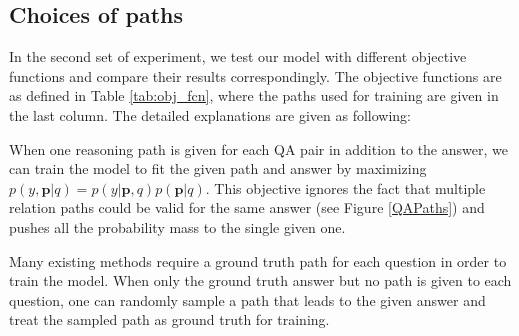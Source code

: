\begin{table}[h]\centering
{}
\caption{\fontsize{10}{12}\selectfont We break test set into two groups based on number of paths associated with them and report F1($\%$).}\label{tab:wqsp_cwq_path_break}
\end{table}

\subsection{Choices of paths} \label{sec:cop}
In the second set of experiment, we test our model with different objective functions and compare their results correspondingly. The objective functions are as defined in Table \ref{tab:obj_fcn}, where the paths used for training are given in the last column. The detailed explanations are given as following:

When one reasoning path is given for each QA pair in addition to the answer, we can train the model to fit the given path and answer by maximizing $p(y,\mathbf{p}|q)=p(y|\mathbf{p},q)p(\mathbf{p}|q)$. This objective ignores the fact that multiple relation paths could be valid for the same answer (see Figure \ref{QAPaths}) and pushes all the probability mass to the single given one.

Many existing methods require a ground truth path for each question in order to train the model.
When only the ground truth answer but no path is given to each question, one can randomly sample a path that leads to the given answer and treat the sampled path as ground truth for training.

